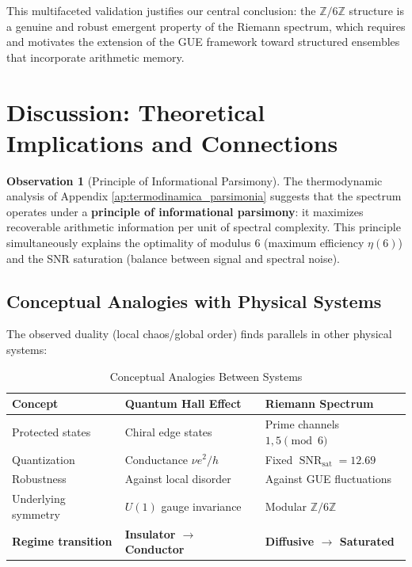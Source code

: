 \documentclass[12pt, a4paper]{article}
\theoremstyle{plain}
\theoremstyle{definition}
\newtheorem{observacion}[teorema]{Observation}
\theoremstyle{remark}
\newcommand{\SNR}{\operatorname{SNR}}
\begin{document}
This multifaceted validation justifies our central conclusion: the $\mathbb{Z}/6\mathbb{Z}$ structure is a genuine and robust emergent property of the Riemann spectrum, which requires and motivates the extension of the GUE framework toward structured ensembles that incorporate arithmetic memory.

\section{Discussion: Theoretical Implications and Connections}
\label{sec:discusion}

\begin{observacion}[Principle of Informational Parsimony]
The thermodynamic analysis of Appendix \ref{ap:termodinamica_parsimonia} suggests that the spectrum operates under a \textbf{principle of informational parsimony}: it maximizes recoverable arithmetic information per unit of spectral complexity. This principle simultaneously explains the optimality of modulus 6 (maximum efficiency $\eta(6)$) and the SNR saturation (balance between signal and spectral noise).
\end{observacion}

\subsection{Conceptual Analogies with Physical Systems}
\label{subsec:analogias}

The observed duality (local chaos/global order) finds parallels in other physical systems:

\begin{table}[H]
\centering
\caption{Conceptual Analogies Between Systems}
\label{tab:analogias}
\begin{tabular}{@{}lll@{}}
\toprule
\textbf{Concept} & \textbf{Quantum Hall Effect} & \textbf{Riemann Spectrum} \\
\midrule
Protected states & Chiral edge states & Prime channels $1,5 \pmod{6}$ \\
Quantization & Conductance $\nu e^2/h$ & Fixed $\SNR_{\text{sat}} = 12.69$ \\
Robustness & Against local disorder & Against GUE fluctuations \\
Underlying symmetry & $U(1)$ gauge invariance & Modular $\mathbb{Z}/6\mathbb{Z}$ \\
\hline
\textbf{Regime transition} & \textbf{Insulator $\to$ Conductor} & \textbf{Diffusive $\to$ Saturated} \\
\bottomrule
\end{tabular}
\end{table}
\end{document}
